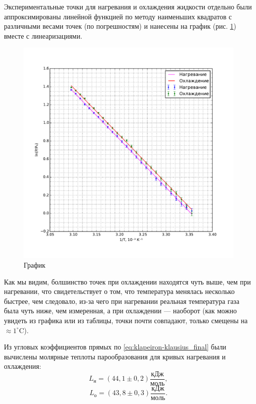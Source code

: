 \documentclass[12pt]{article}
\begin{document}
	Экспериментальные точки для нагревания и охлаждения жидкости отдельно были аппроксимированы линейной функцией по методу наименьших квадратов с различными весами точек (по погрешностям) и нанесены на график (рис. \ref{fig:graph}) вместе с линеаризациями.
	
	\begin{figure}[!h]
	\caption{График}
	\label{fig:graph}
	\begin{center}
	\includegraphics[scale=0.85]{graph.pdf}
	\end{center}
	\end{figure}
	
	Как мы видим, болшинство точек при охлаждении находятся чуть выше, чем при нагревании, что свидетельствует о том, что температура менялась несколько быстрее, чем следовало, из-за чего при нагревании реальная температура газа была чуть ниже, чем измеренная, а при охлаждении --- наоборот (как можно увидеть из графика или из таблицы, точки почти совпадают, только смещены на $\approx 1 ^\circ \text{C}$).
	
	Из угловых коэффициентов прямых по \eqref{eq:klapeiron-klausius_final} были вычислены молярные теплоты парообразования для кривых нагревания и охлаждения:
	$$ L_\text{н}= \left( 44{,}1 \pm 0{,}2 \right) \frac{\text{кДж}}{\text{моль}}, $$
	$$ L_\text{о}= \left( 43{,}8 \pm 0{,}3 \right) \frac{\text{кДж}}{\text{моль}}. $$
	
\end{document}
